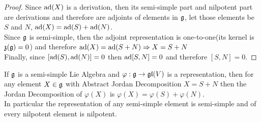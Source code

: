 \begin{proof}
Since $\text{ad}(X)$ is a derivation, then its semi-simple part and nilpotent part are derivations and therefore are adjoints of elements in $\mathfrak{g}$, let those elements be $S$ and $N$, $\text{ad}(X)=\text{ad}(S)+\text{ad}(N)$.\\
Since $\mathfrak{g}$ is semi-simple, then the adjoint representation is one-to-one(its kernel is $\mathfrak{z}(\mathfrak{g})=0$) and therefore $\text{ad}(X)=\text{ad}(S+N) \Rightarrow X=S+N$\\
Finally, since $[\text{ad}(S),\text{ad}(N)]=0$ then $\text{ad}[S,N]=0$ and therefore $[S,N]=0$.
\end{proof}
\begin{prop}
	If $\mathfrak{g}$ is a semi-simple Lie Algebra and $\varphi:\mathfrak{g} \rightarrow \mathfrak{gl}(V)$ is a representation, then for any element $X \in \mathfrak{g}$ with Abstract Jordan Decomposition $X=S+N$ then the Jordan Decomposition of $\varphi(X)$ is $\varphi(X)=\varphi(S)+\varphi(N)$.\\
	In particular the representation of any semi-simple element is semi-simple and of every nilpotent element is nilpotent.
	\label{PreservationOfAbsJordan} 
\end{prop}